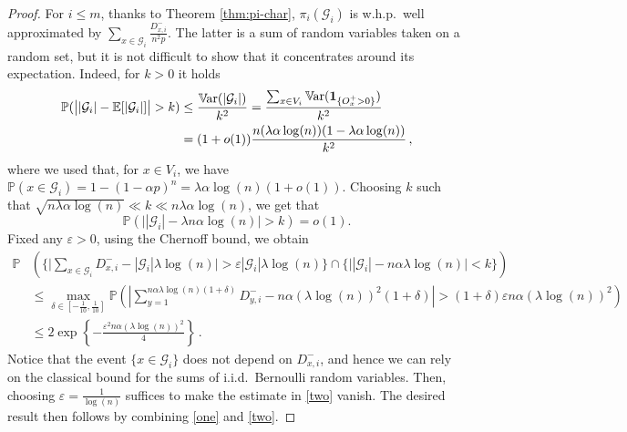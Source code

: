 \documentclass[11pt,oneside]{amsart}
\numberwithin{equation}{section}  %
\theoremstyle{plain}
\newcommand{\whp}{{w.h.p.~}}
\newcommand{\iid}{{i.i.d.~}}
\newcommand{\eps}{\varepsilon}
\newcommand{\E}{\mathbb{E}}
\newcommand{\p}{\mathbb{P}}
\newcommand{\PP}{\mathbb{P}}
\newcommand{\one}{\textup{\textbf{1}}}
\newcommand{\var}{\mathbb{V}\hspace{-1pt}{\rm ar}}
\newcommand{\gates}{\mathcal{G}}
\begin{document}
\begin{proof}
	For $i \le m$, thanks to Theorem \ref{thm:pi-char}, $\pi_i(\gates_i)$ is \whp well approximated by $\sum_{x \in \gates_i}\frac{D_{x,i}^-}{n^2p}$.
	The latter is a sum of random variables taken on a random set, but it is not difficult to show that it concentrates around its expectation. Indeed, for $k>0$ it holds
	\begin{equation} \label{eq:card-gates}
	\begin{split}
		\p(\big||\gates_i|-\E[|\gates_i |]\big|>k)&\le \frac{\var(|\gates_i|)}{k^2}=  \frac{\sum_{x \in V_i}\var(\one_{\{O_x^+>0\}})}{k^2}\\
		&= (1+o(1))\frac{n( \lambda \alpha \log(n))(1- \lambda \alpha \log(n))}{k^2}\,,
	\end{split}
	\end{equation}
    where we used that, for $x \in V_i$, we have 	
    $ 	\PP(x\in \gates_i)=1-(1-\alpha p)^n
	=\lambda \alpha \log(n)(1+o(1))$.
	Choosing $k$ such that $\sqrt{n \lambda\alpha \log(n)} \ll k \ll n\lambda\alpha \log(n)$, we get that
	\begin{equation} \label{one}
	\p\left(\big||\gates_i|-\lambda n \alpha \log(n)\big|>k\right) = o(1).
	\end{equation}
	Fixed any $\varepsilon>0$,
    using the Chernoff bound, we obtain
\begin{equation}\label{two}
	\begin{split}
		\p&\left(
        \bigg\{\bigg|\sum_{x \in \gates_i}{D_{x,i}^-}-|\gates_i|\lambda \log(n)\bigg|>\eps |\gates_i|\lambda \log(n)\bigg\}  
        \cap \bigg\{\Big||\gates_i|-n \alpha \lambda\log(n)\Big|<k\bigg\}
        \right) \\
		&\le\max_{\delta\in[-\frac1{10},\frac1{10}]} \p\left(\left|\sum_{y=1}^{n\alpha \lambda \log(n) (1+\delta)}{D_{y,i}^-}-n \alpha (\lambda\log(n))^2(1+\delta)\right|>(1+\delta)\eps n \alpha (\lambda\log(n))^2\right)\\
		&\le 2\exp\left\{-\frac{\eps^2 n \alpha (\lambda\log(n))^2}4\right\}\,.
	\end{split}
	\end{equation}
	Notice that the event $\{x \in \gates_i\}$ does not depend on $D_{x,i}^-$, and hence we can rely on the classical bound for the sums of \iid Bernoulli random variables. Then, choosing $\eps=\frac{1}{\log(n)}$ suffices to make the estimate in \eqref{two} vanish. The desired result then follows by combining \eqref{one} and \eqref{two}.
\end{proof}
\end{document}
